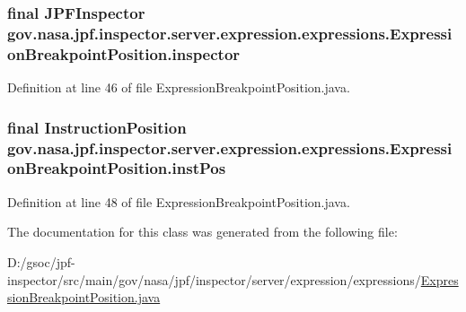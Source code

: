\subsubsection[{\texorpdfstring{inspector}{inspector}}]{\setlength{\rightskip}{0pt plus 5cm}final {\bf J\+P\+F\+Inspector} gov.\+nasa.\+jpf.\+inspector.\+server.\+expression.\+expressions.\+Expression\+Breakpoint\+Position.\+inspector\hspace{0.3cm}{\ttfamily [private]}}\hypertarget{classgov_1_1nasa_1_1jpf_1_1inspector_1_1server_1_1expression_1_1expressions_1_1_expression_breakpoint_position_a8a3d5dc750a8f629e27046cd30eb34f7}{}\label{classgov_1_1nasa_1_1jpf_1_1inspector_1_1server_1_1expression_1_1expressions_1_1_expression_breakpoint_position_a8a3d5dc750a8f629e27046cd30eb34f7}


Definition at line 46 of file Expression\+Breakpoint\+Position.\+java.

\subsubsection[{\texorpdfstring{inst\+Pos}{instPos}}]{\setlength{\rightskip}{0pt plus 5cm}final {\bf Instruction\+Position} gov.\+nasa.\+jpf.\+inspector.\+server.\+expression.\+expressions.\+Expression\+Breakpoint\+Position.\+inst\+Pos\hspace{0.3cm}{\ttfamily [private]}}\hypertarget{classgov_1_1nasa_1_1jpf_1_1inspector_1_1server_1_1expression_1_1expressions_1_1_expression_breakpoint_position_a8f9bc711f79a45ff712cbfb1253e677b}{}\label{classgov_1_1nasa_1_1jpf_1_1inspector_1_1server_1_1expression_1_1expressions_1_1_expression_breakpoint_position_a8f9bc711f79a45ff712cbfb1253e677b}


Definition at line 48 of file Expression\+Breakpoint\+Position.\+java.



The documentation for this class was generated from the following file\+:\begin{DoxyCompactItemize}
\item 
D\+:/gsoc/jpf-\/inspector/src/main/gov/nasa/jpf/inspector/server/expression/expressions/\hyperlink{_expression_breakpoint_position_8java}{Expression\+Breakpoint\+Position.\+java}\end{DoxyCompactItemize}
